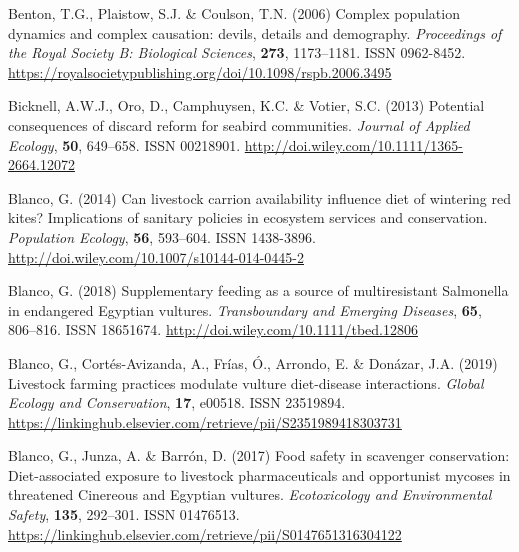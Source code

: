 \documentclass[12pt]{article}
\begin{document}
\begin{thebibliography}{87}
	Benton, T.G., Plaistow, S.J. \& Coulson, T.N. (2006) {Complex population
		dynamics and complex causation: devils, details and demography}.
	\newblock \emph{Proceedings of the Royal Society B: Biological Sciences},
	\textbf{273}, 1173--1181.
	\newblock ISSN 0962-8452.
	\newline\urlprefix\url{https://royalsocietypublishing.org/doi/10.1098/rspb.2006.3495}
	
	Bicknell, A.W.J., Oro, D., Camphuysen, K.C. \& Votier, S.C. (2013) {Potential
		consequences of discard reform for seabird communities}.
	\newblock \emph{Journal of Applied Ecology}, \textbf{50}, 649--658.
	\newblock ISSN 00218901.
	\newline\urlprefix\url{http://doi.wiley.com/10.1111/1365-2664.12072}
	
	Blanco, G. (2014) {Can livestock carrion availability influence diet of
		wintering red kites? Implications of sanitary policies in ecosystem services
		and conservation}.
	\newblock \emph{Population Ecology}, \textbf{56}, 593--604.
	\newblock ISSN 1438-3896.
	\newline\urlprefix\url{http://doi.wiley.com/10.1007/s10144-014-0445-2}
	
	Blanco, G. (2018) {Supplementary feeding as a source of multiresistant
		Salmonella in endangered Egyptian vultures}.
	\newblock \emph{Transboundary and Emerging Diseases}, \textbf{65}, 806--816.
	\newblock ISSN 18651674.
	\newline\urlprefix\url{http://doi.wiley.com/10.1111/tbed.12806}
	
	Blanco, G., Cort{\'{e}}s-Avizanda, A., Fr{\'{i}}as, {\'{O}}., Arrondo, E. \&
	Don{\'{a}}zar, J.A. (2019) {Livestock farming practices modulate vulture
		diet-disease interactions}.
	\newblock \emph{Global Ecology and Conservation}, \textbf{17}, e00518.
	\newblock ISSN 23519894.
	\newline\urlprefix\url{https://linkinghub.elsevier.com/retrieve/pii/S2351989418303731}
	
	Blanco, G., Junza, A. \& Barr{\'{o}}n, D. (2017) {Food safety in scavenger
		conservation: Diet-associated exposure to livestock pharmaceuticals and
		opportunist mycoses in threatened Cinereous and Egyptian vultures}.
	\newblock \emph{Ecotoxicology and Environmental Safety}, \textbf{135},
	292--301.
	\newblock ISSN 01476513.
	\newline\urlprefix\url{https://linkinghub.elsevier.com/retrieve/pii/S0147651316304122}
	

\end{thebibliography}
\end{document}
